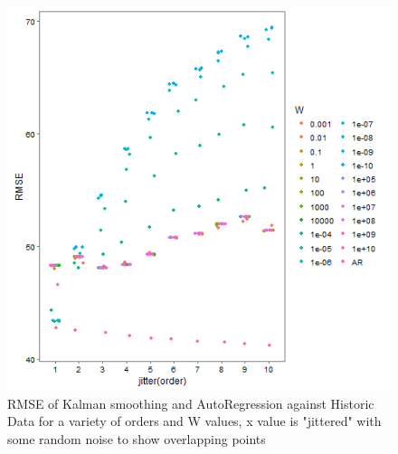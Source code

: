 \documentclass{sig-alternate-05-2015}
\begin{document}
\begin{figure}[ht]

	\includegraphics[width=\linewidth]{RMSE_order_real.png}
	\centering
	\caption{RMSE of Kalman smoothing and AutoRegression against Historic Data for a variety of orders and W values, x value is "jittered" with some random noise to show overlapping points}
			\label{fig:RMSE_real}

\end{figure}
\end{document}
